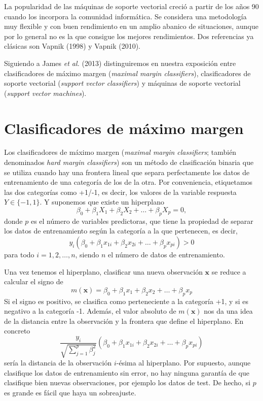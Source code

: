 \documentclass[
]{book}
\theoremstyle{break}
\theoremstyle{definition}
\theoremstyle{definition}
\theoremstyle{definition}
\theoremstyle{definition}
\theoremstyle{remark}
\begin{document}
La popularidad de las máquinas de soporte vectorial creció a partir de los años 90 cuando los incorpora la comunidad informática. Se considera una metodología muy flexible y con buen rendimiento en un amplio abanico de situaciones, aunque por lo general no es la que consigue los mejores rendimientos. Dos referencias ya clásicas son Vapnik (1998) y Vapnik (2010).

Siguiendo a James \emph{et al.} (2013) distinguiremos en nuestra exposición entre clasificadores de máximo margen (\emph{maximal margin classifiers}), clasificadores de soporte vectorial (\emph{support vector classifiers}) y máquinas de soporte vectorial (\emph{support vector machines}).

\hypertarget{clasificadores-de-muxe1ximo-margen}{%
\section{Clasificadores de máximo margen}\label{clasificadores-de-muxe1ximo-margen}}

Los clasificadores de máximo margen (\emph{maximal margin classifiers}; también denominados \emph{hard margin classifiers}) son un método de clasificación binaria que se utiliza cuando hay una frontera lineal que separa perfectamente los datos de entrenamiento de una categoría de los de la otra. Por conveniencia, etiquetamos las dos categorías como +1/-1, es decir, los valores de la variable respuesta \(Y \in \{-1, 1\}\). Y suponemos que existe un hiperplano
\[ \beta_0 + \beta_1 X_1 + \beta_2 X_2 + \ldots + \beta_p X_p = 0,\]
donde \(p\) es el número de variables predictoras, que tiene la propiedad de separar los datos de entrenamiento según la categoría a la que pertenecen, es decir,
\[ y_i(\beta_0 + \beta_1 x_{1i} + \beta_2 x_{2i} + \ldots + \beta_p x_{pi}) > 0\]
para todo \(i = 1, 2, \ldots, n\), siendo \(n\) el número de datos de entrenamiento.

Una vez tenemos el hiperplano, clasificar una nueva observación \(\mathbf{x}\) se reduce a calcular el signo de
\[m(\mathbf{x}) = \beta_0 + \beta_1 x_1 + \beta_2 x_2 + \ldots + \beta_p x_p\]
Si el signo es positivo, se clasifica como perteneciente a la categoría +1, y si es negativo a la categoría -1. Además, el valor absoluto de \(m(\mathbf{x})\) nos da una idea de la distancia entre la observación y la frontera que define el hiperplano. En concreto
\[\frac{y_i}{\sqrt {\sum_{j=1}^p \beta_j^2}}(\beta_0 + \beta_1 x_{1i} + \beta_2 x_{2i} + \ldots + \beta_p x_{pi})\]
sería la distancia de la observación \(i\)-ésima al hiperplano.
Por supuesto, aunque clasifique los datos de entrenamiento sin error, no hay ninguna garantía de que clasifique bien nuevas observaciones, por ejemplo los datos de test. De hecho, si \(p\) es grande es fácil que haya un sobreajuste.
\end{document}
